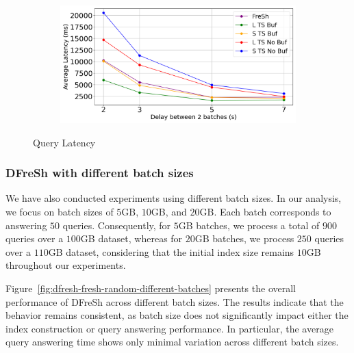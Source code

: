 \begin{figure}
	\centering
	\begin{subfigure}[c]{0.6\textwidth}
		\includegraphics[width=1\textwidth]   {figures/Experiments/Dynamic/Latency/average_latency.png}
		\label{fig:average-latency}
	\end{subfigure}
	\caption{Query Latency}
	\label{fig:latency-random}
\end{figure}

\subsubsection{DFreSh with different batch sizes}

We have also conducted experiments using different batch sizes. In our analysis,
we focus on batch sizes of $5$GB, $10$GB, and $20$GB. Each batch corresponds to
answering $50$ queries. Consequently, for $5$GB batches, we process a total of
$900$ queries over a $100$GB dataset, whereas for $20$GB batches, we process
$250$ queries over a $110$GB dataset, considering that the initial index size
remains $10$GB throughout our experiments.

Figure~\ref{fig:dfresh-fresh-random-different-batches} presents the overall
performance of DFreSh across different batch sizes. The results indicate that the
behavior remains consistent, as batch size does not significantly impact either the
index construction or query answering performance. In particular, the average query
answering time shows only minimal variation across different batch sizes.

